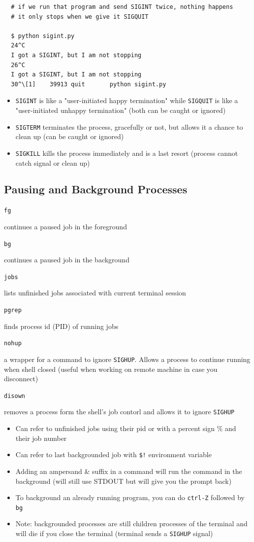 \documentclass[letterpaper,12pt]{article}
\newcommand*{\lstitem}[1]{
  \setbox0\hbox{\lstinline{#1}}
  \item[\usebox0]
}
\begin{document}
\begin{lstlisting}
  # if we run that program and send SIGINT twice, nothing happens
  # it only stops when we give it SIGQUIT

  $ python sigint.py
  24^C
  I got a SIGINT, but I am not stopping
  26^C
  I got a SIGINT, but I am not stopping
  30^\[1]    39913 quit       python sigint.py
\end{lstlisting}

\begin{itemize}
 \item \lstinline{SIGINT} is like a "user-initiated happy termination" while \lstinline{SIGQUIT} is like a "user-initiated unhappy termination" (both can be caught or ignored)
 \item \lstinline{SIGTERM} terminates the process, gracefully or not, but allows it a chance to clean up (can be caught or ignored)
 \item \lstinline{SIGKILL} kills the process immediately and is a last resort (process cannot catch signal or clean up)
\end{itemize}

\subsection{Pausing and Background Processes}
\begin{description}
 \lstitem{fg} continues a paused job in the foreground
 \lstitem{bg} continues a paused job in the background
 \lstitem{jobs} lists unfinished jobs associated with current terminal session
 \lstitem{pgrep} finds process id (PID) of running jobs
 \lstitem{nohup} a wrapper for a command to ignore \lstinline{SIGHUP}. Allows a process to continue running when shell closed (useful when working on remote machine in case you disconnect)
 \lstitem{disown} removes a process form the shell's job contorl and allows it to ignore \lstinline{SIGHUP}
\end{description}

\begin{itemize}
 \item Can refer to unfinished jobs using their pid or with a percent sign \% and their job number
 \item Can refer to last backgrounded job with \lstinline{$!} environment variable
 \item Adding an ampersand \& suffix in a command will run the command in the background (will still use STDOUT but will give you the prompt back)
 \item To background an already running program, you can do \lstinline{ctrl-Z} followed by \lstinline{bg}
 \item Note: backgrounded processes are still children processes of the terminal and will die if you close the terminal (terminal sends a \lstinline{SIGHUP} signal)
\end{itemize}
\end{document}

